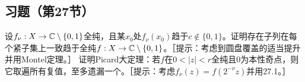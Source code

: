 \subsection*{习题（第27节）}
设$f_\nu:X\to\mathbb C\setminus\{0,1\}$全纯，且某$x_0$处$f_\nu(x_0)$趋于$c\notin\{0,1\}$。证明存在子列在每个紧子集上一致趋于全纯$f:X\to\mathbb C\setminus\{0,1\}$。［提示：考虑到圆盘覆盖的适当提升并用Montel定理。］
证明Picard大定理：若$f$在$0<|z|<r$全纯且0为本性奇点，则它取遍所有复值，至多遗漏一个。［提示：考虑$f_\nu(z)=f(2^{-\nu}z)$并用27.1。］
